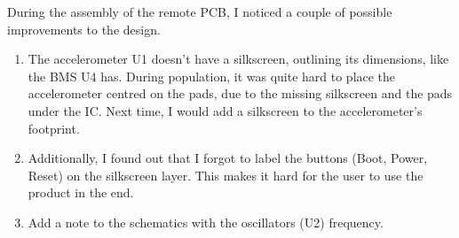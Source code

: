  During the assembly of the remote PCB, I noticed a couple of possible improvements to the design.
 \begin{enumerate}
     \item The accelerometer U1 doesn't have a silkscreen, outlining its dimensions, like the BMS U4 has. During population, it was quite hard to place the accelerometer centred on the pads, due to the missing silkscreen and the pads under the IC. Next time, I would add a silkscreen to the accelerometer's footprint. 
     \item Additionally, I found out that I forgot to label the buttons (Boot, Power, Reset) on the silkscreen layer. This makes it hard for the user to use the product in the end.
     \item Add a note to the schematics with the oscillators (U2) frequency.
 \end{enumerate}